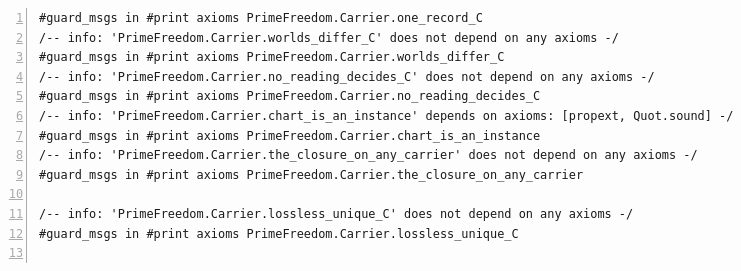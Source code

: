 \documentclass[10pt]{article}
\newcommand{\leansize}{\fontsize{5.5pt}{6.75pt}\selectfont}
\begin{document}
\begin{multicols}{2}
\begin{Verbatim}[numbers=left,firstnumber=1,numbersep=3pt,xleftmargin=2.6em,breaklines=true,breakanywhere=true,breakautoindent=false,breakindent=1.4em,breaksymbolleft={},breakanywheresymbolpre={},fontsize=\leansize]
#guard_msgs in #print axioms PrimeFreedom.Carrier.one_record_C
/-- info: 'PrimeFreedom.Carrier.worlds_differ_C' does not depend on any axioms -/
#guard_msgs in #print axioms PrimeFreedom.Carrier.worlds_differ_C
/-- info: 'PrimeFreedom.Carrier.no_reading_decides_C' does not depend on any axioms -/
#guard_msgs in #print axioms PrimeFreedom.Carrier.no_reading_decides_C
/-- info: 'PrimeFreedom.Carrier.chart_is_an_instance' depends on axioms: [propext, Quot.sound] -/
#guard_msgs in #print axioms PrimeFreedom.Carrier.chart_is_an_instance
/-- info: 'PrimeFreedom.Carrier.the_closure_on_any_carrier' does not depend on any axioms -/
#guard_msgs in #print axioms PrimeFreedom.Carrier.the_closure_on_any_carrier

/-- info: 'PrimeFreedom.Carrier.lossless_unique_C' does not depend on any axioms -/
#guard_msgs in #print axioms PrimeFreedom.Carrier.lossless_unique_C


\end{Verbatim}
\end{multicols}
\end{document}
